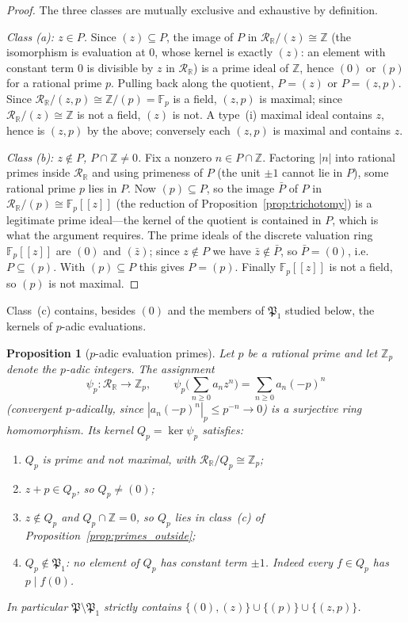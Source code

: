 \documentclass[12pt]{amsart}
\newtheorem{proposition}[theorem]{Proposition}
\theoremstyle{definition}
\newcommand{\Z}{\mathbb{Z}}
\newcommand{\abs}[1]{\left|#1\right|}
\newcommand{\mRR}{\mathcal{R}_{\mathbb{R}}}
\begin{document}
\begin{proof}
The three classes are mutually exclusive and exhaustive by definition.

\medskip\noindent\emph{Class (a): $z \in P$.}  Since $(z) \subseteq P$,
the image of $P$ in $\mRR/(z) \cong \Z$ (the isomorphism is evaluation at
$0$, whose kernel is exactly $(z)$: an element with constant term $0$ is
divisible by $z$ in $\mRR$) is a prime ideal of $\Z$, hence $(0)$ or
$(p)$ for a rational prime $p$.  Pulling back along the quotient, $P =
(z)$ or $P = (z,p)$.  Since $\mRR/(z,p) \cong \Z/(p) = \mathbb{F}_p$ is a
field, $(z,p)$ is maximal; since $\mRR/(z) \cong \Z$ is not a field,
$(z)$ is not.  A type~(i) maximal ideal contains $z$, hence is $(z,p)$
by the above; conversely each $(z,p)$ is maximal and contains $z$.

\medskip\noindent\emph{Class (b): $z \notin P$, $P \cap \Z \neq 0$.}
Fix a nonzero $n \in P \cap \Z$.  Factoring $\abs{n}$ into rational
primes inside $\mRR$ and using primeness of $P$ (the unit $\pm 1$ cannot
lie in $P$), some rational prime $p$ lies in $P$.  Now $(p) \subseteq
P$, so the image $\bar P$ of $P$ in $\mRR/(p) \cong \mathbb{F}_p[[z]]$
(the reduction of Proposition~\ref{prop:trichotomy}) is a legitimate
prime ideal---the kernel of the quotient is contained in $P$, which is
what the argument requires.  The prime ideals of the discrete valuation
ring $\mathbb{F}_p[[z]]$ are $(0)$ and $(\bar z)$; since $z \notin P$ we
have $\bar z \notin \bar P$, so $\bar P = (0)$, i.e.\ $P \subseteq (p)$.
With $(p) \subseteq P$ this gives $P = (p)$.  Finally
$\mathbb{F}_p[[z]]$ is not a field, so $(p)$ is not maximal.
\end{proof}

Class~(c) contains, besides $(0)$ and the members of $\mathfrak{P}_1$
studied below, the kernels of $p$-adic evaluations.

\begin{proposition}[$p$-adic evaluation primes]
\label{prop:padic}
Let $p$ be a rational prime and let $\Z_p$ denote the $p$-adic integers.
The assignment
\[
  \psi_p \colon \mRR \longrightarrow \Z_p, \qquad
  \psi_p\Big(\sum_{n \geq 0} a_n z^n\Big) = \sum_{n \geq 0} a_n (-p)^n
\]
(convergent $p$-adically, since $\abs{a_n(-p)^n}_p \leq p^{-n} \to 0$) is
a surjective ring homomorphism.  Its kernel $Q_p = \ker \psi_p$
satisfies:
\begin{enumerate}
\item[(i)] $Q_p$ is prime and not maximal, with $\mRR/Q_p \cong \Z_p$;
\item[(ii)] $z + p \in Q_p$, so $Q_p \neq (0)$;
\item[(iii)] $z \notin Q_p$ and $Q_p \cap \Z = 0$, so $Q_p$ lies in
  class~\emph{(c)} of Proposition~\ref{prop:primes_outside};
\item[(iv)] $Q_p \notin \mathfrak{P}_1$: no element of $Q_p$ has constant
  term $\pm 1$.  Indeed every $f \in Q_p$ has $p \mid f(0)$.
\end{enumerate}
In particular $\mathfrak{P} \setminus \mathfrak{P}_1$ strictly contains
$\{(0), (z)\} \cup \{(p)\} \cup \{(z,p)\}$.
\end{proposition}
\end{document}
